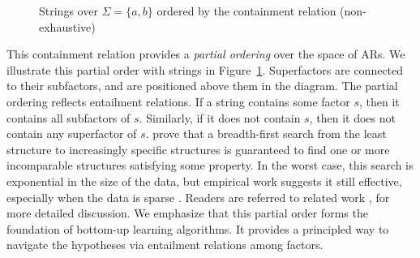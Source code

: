 \documentclass[pmlr]{jmlr}%
\begin{document}
	\begin{figure}
		\centering
		\caption{Strings over $\Sigma = \{a,b\}$ ordered by the containment relation (non-exhaustive)}
		\label{fig:hasse}
	\end{figure}This containment relation provides a \textit{partial
		ordering} over the space of ARs. We illustrate this partial order
	with strings in Figure~\ref{fig:hasse}.  Superfactors are connected to
	their subfactors, and are positioned above them in the diagram. The
	partial ordering reflects entailment relations. If a string
	contains some factor \(s\), then it contains all subfactors of
	\(s\). Similarly, if it does not contain \(s\), then it does not
	contain any superfactor of \(s\). \citet{chandleeBufia2019} prove that
	a breadth-first search from the least structure to increasingly
	specific structures is guaranteed to find one or more
	incomparable structures satisfying some property.
	In the worst case, this search is exponential in the size of the data,
	but empirical work suggests it still effective,
	especially when the data is sparse \citep{Swanson+2025, LiHeinzPhO2026}. 
	Readers are referred to related work 
	\citep{rawski2021structure,
		swanson2025learning,payne2024generalized,li2025learning},
	for more detailed discussion.
	We emphasize that this partial order forms the foundation of bottom-up
	learning algorithms. It provides a principled way to navigate
	the hypotheses via entailment relations among factors.
	
\end{document}
